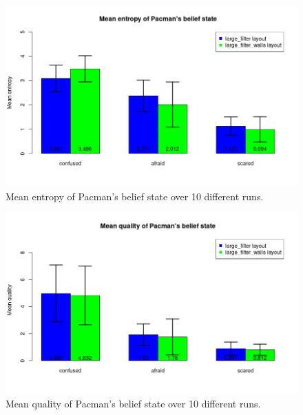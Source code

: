 \documentclass{article}
\begin{document}
\begin{enumerate}[label=\alph*.,leftmargin=*]
\begin{figure}[H]
    \centering
    \includegraphics[scale=0.75]{plots/pacman_belief_state.png} 
    \caption{Mean entropy of Pacman's belief state over 10 different runs.}
\end{figure}

\begin{figure}[H]
    \centering
    \includegraphics[scale=0.75]{plots/differences.png} 
    \caption{Mean quality of Pacman's belief state over 10 different runs.}
\end{figure}
    

\end{enumerate}
\end{document}
